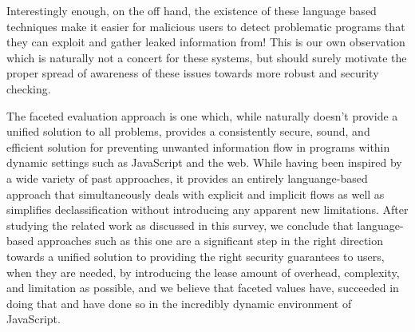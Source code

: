 \documentclass[preprint]{sigplanconf}
\begin{document}
Interestingly enough, on the off hand, the existence of these language based techniques make it easier for malicious users to detect problematic programs that they can exploit and gather leaked information from! This is our own observation which is naturally not a concert for these systems, but should surely motivate the proper spread of awareness of these issues towards more robust and security checking.

The faceted evaluation approach is one which, while naturally doesn't provide a unified solution to all problems, provides a consistently secure, sound, and efficient solution for preventing unwanted information flow in programs within dynamic settings such as JavaScript and the web. While having been inspired by a wide variety of past approaches, it provides an entirely languange-based approach that simultaneously deals with explicit and implicit flows as well as simplifies declassification without introducing any apparent new limitations. After studying the related work as discussed in this survey, we conclude that language-based approaches such as this one are a significant step in the right direction towards  a unified solution to providing the right security guarantees to users, when they are needed, by introducing the lease amount of overhead, complexity, and limitation as possible, and we believe that faceted values have, succeeded in doing that and have done so in the incredibly dynamic environment of JavaScript.




\end{document}
